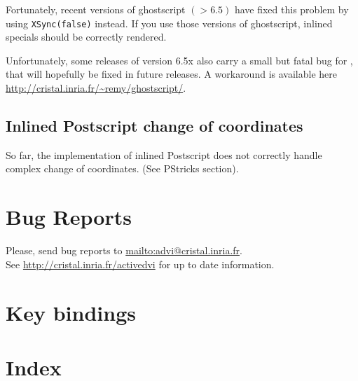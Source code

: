 \documentclass[12pt]{article}
\begin{document}
Fortunately, recent versions of ghostscript $(> 6.5)$ have
fixed this problem by using {\tt XSync(false)} instead.
If you use those versions of ghostscript, inlined specials should be
correctly rendered.

Unfortunately, some releases of version 6.5x also carry a small but
fatal bug for \ActiveDVI, that will hopefully be fixed in future
releases. A workaround is available here
\url{http://cristal.inria.fr/~remy/ghostscript/}.

\subsection*{Inlined Postscript change of coordinates}

So far, the implementation of inlined Postscript does not correctly handle
complex change of coordinates.  (See PStricks section). 

\section {Bug Reports}

Please, send bug reports to 
\url{mailto:advi@cristal.inria.fr}. 
\\
See \url{http://cristal.inria.fr/activedvi} for up to date information.


\section {Key bindings}

\section {Index}

\printindex
\end{document}
